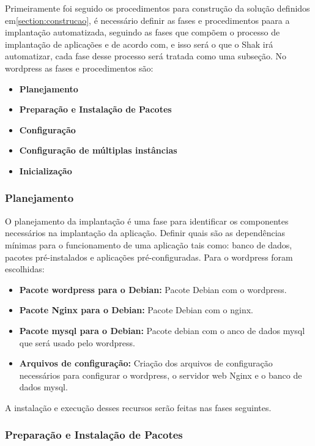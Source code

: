 Primeiramente foi seguido os procedimentos para construção da solução definidos em\ref{section:construcao}, é
necessário definir as fases e procedimentos paara a implantação automatizada,
seguindo as fases que compõem o processo de implantação de aplicações e de acordo
 com\cite{omg2006}, e isso será o que o Shak irá automatizar, cada fase desse processo
 será  tratada como uma subseção. No wordpress as fases e procedimentos são:

\begin{itemize}
  \item  \textbf{Planejamento}
  \item  \textbf{Preparação e Instalação de Pacotes}
  \item  \textbf{Configuração}
  \item  \textbf{Configuração de múltiplas instâncias}
  \item  \textbf{Inicialização}
\end{itemize}


\subsubsection{Planejamento}

O planejamento da implantação é uma fase para identificar os componentes
necessários na implantação da aplicação. Definir quais são as dependências mínimas
para o funcionamento de uma aplicação tais como: banco de dados, pacotes
pré-instalados e aplicações pré-configuradas. Para o wordpress foram escolhidas:

\begin{itemize}
   \item \textbf{Pacote wordpress para o Debian:} Pacote Debian com o wordpress.
   \item \textbf{Pacote Nginx para o Debian:} Pacote Debian com o nginx.
   \item \textbf{Pacote mysql para o Debian:} Pacote debian com o anco de dados mysql
   que será usado pelo wordpress.
   \item \textbf{Arquivos de configuração:} Criação dos arquivos de configuração
   necessários para configurar o wordpress, o servidor web Nginx e o banco de dados
   mysql.
\end{itemize}

A instalação e execução desses recursos serão feitas nas fases seguintes.

\subsubsection{Preparação e Instalação de Pacotes}
\label{wordpress:preparacao}

